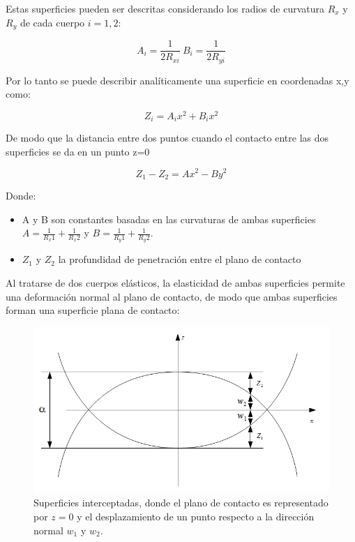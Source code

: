 \documentclass[main]{subfiles}
\begin{document}
Estas superficies pueden ser descritas considerando los radios de curvatura $R_x$ y $R_y$ de cada cuerpo $i=1,2$:

\begin{equation}
A_i=\frac{1}{2R_{xi}} \: B_i=\frac{1}{2R_{yi}}
\end{equation}

Por lo tanto se puede describir analíticamente una superficie en coordenadas x,y como:

\begin{equation}
Z_i=A_ix^2+B_ix^2
\end{equation}

De modo que la distancia entre dos puntos cuando el contacto entre las dos superficies se da en un punto z=0

  \begin{equation}
  Z_1-Z_2=Ax^2-By^2
  \end{equation}

\par \hspace{1cm}
\begin{minipage}{10cm}
\begin{spacing}{0.5}
Donde:
\begin{itemize}
\item A y B son constantes basadas en las curvaturas de ambas superficies $A=\frac{1}{R_x1}+\frac{1}{R_x2}$ y $B=\frac{1}{R_y1}+\frac{1}{R_y2}$.
\item $Z_1$ y $Z_2$ la profundidad de penetración entre el plano de contacto
\end{itemize}
\end{spacing}
\end{minipage}

 Al tratarse de dos cuerpos elásticos, la elasticidad de ambas superficies permite una deformación normal al plano de contacto, de modo que ambas superficies forman una superficie plana de contacto:

\begin{figure}[!htbp]
\centering
    \includegraphics[scale=0.7]{FigZwalpha.png}
  \caption{Superficies interceptadas, donde el plano de contacto es representado por $z=0$ y el desplazamiento de un punto respecto a la dirección normal $w_1$ y $w_2$.}
  \label{fig:PlotZww}
\end{figure} 
\end{document}
